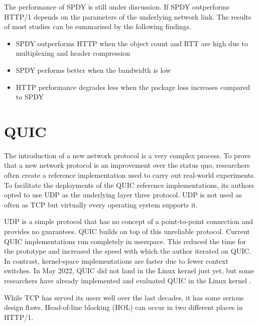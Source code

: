 \documentclass[conference]{IEEEtran}
\begin{document}

The performance of SPDY is still under discussion. If SPDY outperforms HTTP/1 depends on the parameters of the underlying network link. The results of most studies can be summarised by the following findings.

\begin{itemize}
  \item SPDY outperforms HTTP when the object count and RTT are high due to multiplexing and header compression
  \item SPDY performs better when the bandwidth is low
  \item HTTP performance degrades less when the package loss increases compared to SPDY
\end{itemize}


\section{QUIC}

The introduction of a new network protocol is a very complex process. To prove that a new network protocol is an improvement over the status quo, researchers often create a reference implementation used to carry out real-world experiments. To facilitate the deployments of the QUIC reference implementations, its authors opted to use UDP as the underlying layer three protocol. UDP is not used as often as TCP but virtually every operating system supports it.

UDP is a simple protocol that has no concept of a point-to-point connection and provides no guarantees. QUIC builds on top of this unreliable protocol. Current QUIC implementations run completely in userspace. This reduced the time for the prototype and increased the speed with which the author iterated on QUIC. In contrast, kernel-space implementations are faster due to fewer context switches. In May 2022, QUIC did not land in the Linux kernel just yet, but some researchers have already implemented and evaluated QUIC in the Linux kernel \cite{Kernel}.

While TCP has served its users well over the last decades, it has some serious design flaws. Head-of-line blocking (HOL) can occur in two different places in HTTP/1.
\end{document}
